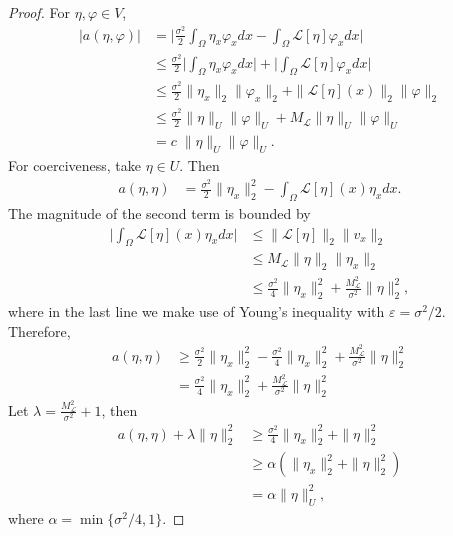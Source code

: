 \documentclass[10pt]{article}
\begin{document}
\begin{proof}
 For $\eta,\varphi \in V$,
 \begin{align*}
     |a(\eta,\varphi)| &= \bigg|\frac{\sigma^2}{2}\int_\Omega \eta_x \varphi_x dx - \int_\Omega \mathcal{L}[\eta] \varphi_x dx\bigg|\\
     &\leq \frac{\sigma^2}{2}\bigg|\int_\Omega \eta_x \varphi_x dx\bigg| + \bigg|\int_\Omega \mathcal{L}[\eta] \varphi_x dx\bigg|\\
     &\leq \frac{\sigma^2}{2} \|\eta_x\|_2 \|\varphi_x\|_2 + \|\mathcal{L}[\eta](x)\|_2 \|\varphi\|_2\\
     &\leq\frac{\sigma^2}{2} \|\eta\|_U \|\varphi\|_U+ M_\mathcal{L}\|\eta\|_U\|\varphi\|_U\\
    &= c\;\|\eta\|_U\|\varphi\|_U.
 \end{align*}
 For coerciveness, take $\eta \in U$. Then
 \begin{align*}
     a(\eta,\eta) &= \frac{\sigma^2}{2} \|\eta_x\|_2^2 - \int_\Omega \mathcal{L}[\eta](x) \eta_x dx.
 \end{align*}
 The magnitude of the second term is bounded by
 \begin{align*}
     \bigg|\int_\Omega \mathcal{L}[\eta](x) \eta_x dx\bigg| &\leq \|\mathcal{L}[\eta]\|_2\|v_x\|_2\\
     &\leq M_\mathcal{L}\|\eta\|_2 \|\eta_x\|_2\\
     &\leq \frac{\sigma^2}{4}\|\eta_x\|_2^2 + \frac{M_\mathcal{L}^2}{\sigma^2}\|\eta\|_2^2,
 \end{align*}
 where in the last line we make use of Young's inequality with $\varepsilon = \sigma^2/2$. Therefore,
 \begin{align*}
     a(\eta,\eta) &\geq \frac{\sigma^2}{2} \|\eta_x\|_2^2 - \frac{\sigma^2}{4}\|\eta_x\|_2^2 + \frac{M_\mathcal{L}^2}{\sigma^2}\|\eta\|_2^2\\
     &= \frac{\sigma^2}{4}\|\eta_x\|_2^2 + \frac{M_\mathcal{L}^2}{\sigma^2}\|\eta\|_2^2
 \end{align*}
 Let $\lambda = \frac{M_\mathcal{L}^2}{\sigma^2} + 1$, then
 \begin{align*}
     a(\eta,\eta) + \lambda\|\eta\|_2^2 &\geq \frac{\sigma^2}{4}\|\eta_x\|_2^2 + \|\eta\|_2^2\\
     &\geq \alpha(\|\eta_x\|_2^2 + \|\eta\|_2^2)\\
     &= \alpha \|\eta\|_U^2,
 \end{align*}
 where $\alpha = \min\{\sigma^2/4, 1\}$.
\end{proof}
\end{document}
